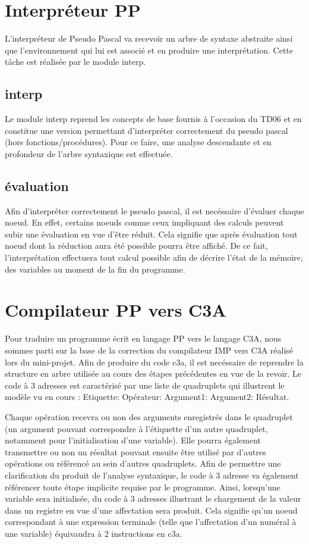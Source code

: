 \documentclass[11pt,a4paper]{article}
\begin{document}
\pagebreak
\section{Interpréteur PP}
L'interpréteur de Pseudo Pascal va recevoir un arbre de syntaxe abstraite ainsi que l'environnement qui lui est associé et en produire une interprétation.
Cette tâche est réalisée par le module interp.
\subsection{interp}
Le module interp reprend les concepts de base fournis à l'occasion du TD06 et en constitue une version permettant d'interpréter correctement du pseudo pascal (hors fonctions/procédures).
Pour ce faire, une analyse descendante et en profondeur de l'arbre syntaxique est effectuée.
\subsection{évaluation}
Afin d'interpréter correctement le pseudo pascal, il est necéssaire d'évaluer chaque noeud.
En effet, certains noeuds comme ceux impliquant des calculs peuvent subir une évaluation en vue d'être réduit.
Cela signifie que après évaluation tout noeud dont la réduction aura été possible pourra être affiché.
De ce fait, l'interprétation effectuera tout calcul possible afin de décrire l'état de la mémoire, des variables au moment de la fin du programme.
\pagebreak
\section{Compilateur PP vers C3A}
Pour traduire un programme écrit en langage PP vers le langage C3A, nous sommes parti sur la base de la correction du compilateur IMP vers C3A réalisé lors du mini-projet.
Afin de produire du code c3a, il est necéssaire de reprendre la structure en arbre utilisée au cours des étapes précédentes en vue de la revoir.
Le code à 3 adresses est caractérisé par une liste de quadruplets qui illustrent le modèle vu en cours :
Etiquette: Opérateur: Argument1: Argument2: Résultat.
\par
Chaque opération recevra ou non des arguments enregistrés dans le quadruplet (un argument pouvant correspondre à l'étiquette d'un autre quadruplet, notamment pour l'initialisation d'une variable).
Elle pourra également transmettre ou non un résultat pouvant ensuite être utilisé par d'autres opérations ou référencé au sein d'autres quadruplets.
Afin de permettre une clarification du produit de l'analyse syntaxique, le code à 3 adresse va également référencer toute étape implicite requise par le programme.
Ainsi, lorsqu'une variable sera initialisée, du code à 3 adresses illustrant le chargement de la valeur dans un registre en vue d'une affectation sera produit.
Cela signifie qu'un noeud correspondant à une expression terminale (telle que l'affectation d'un numéral à une variable) équivaudra à 2 instructions en c3a.
\pagebreak
\end{document}
